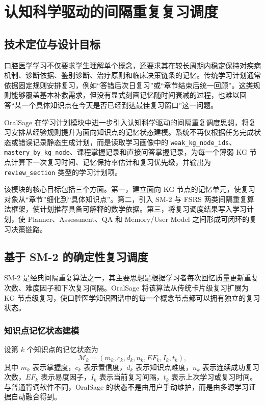
\chapter{认知科学驱动的间隔重复复习调度}
\label{sec:spaced-repetition-scheduling}

\section{技术定位与设计目标}

口腔医学学习不仅要求学生理解单个概念，还要求其在较长周期内稳定保持对疾病机制、诊断依据、鉴别诊断、治疗原则和临床决策链条的记忆。传统学习计划通常依据固定规则安排复习，例如“答错后次日复习”或“章节结束后统一回顾”。这类规则能够覆盖基本补救需求，但没有显式刻画记忆随时间衰减的过程，也难以回答“某一个具体知识点在今天是否已经到达最佳复习窗口”这一问题。

OralSage 在学习计划模块中进一步引入认知科学驱动的间隔重复调度思想，将复习安排从经验规则提升为面向知识点的记忆状态建模。系统不再仅根据任务完成状态或错误记录静态生成计划，而是读取学习画像中的 \texttt{weak\_kg\_node\_ids}、\texttt{mastery\_by\_kg\_node}、课程掌握记录和直接问答掌握记录，为每一个薄弱 KG 节点计算下一次复习时间、记忆保持率估计和复习优先级，并输出为 \texttt{review\_section} 类型的学习计划项。

该模块的核心目标包括三个方面。第一，建立面向 KG 节点的记忆单元，使复习对象从“章节”细化到“具体知识点”。第二，引入 SM-2 与 FSRS 两类间隔重复算法框架，使计划推荐具备可解释的数学依据。第三，将复习调度结果写入学习计划，使 Planner、Assessment、QA 和 Memory/User Model 之间形成可闭环的复习决策链路。

\section{基于 SM-2 的确定性复习调度}

SM-2 是经典间隔重复算法之一，其主要思想是根据学习者每次回忆质量更新重复次数、难度因子和下次复习间隔\cite{wozniak1990sm2}。OralSage 将该算法从传统卡片级复习扩展为 KG 节点级复习，使口腔医学知识图谱中的每一个概念节点都可以拥有独立的复习状态。

\subsection{知识点记忆状态建模}

设第 $k$ 个知识点的记忆状态为
\begin{equation}
  \mathcal{M}_k=(m_k,c_k,d_k,n_k,EF_k,I_k,t_k),
\end{equation}
其中 $m_k$ 表示掌握度，$c_k$ 表示置信度，$d_k$ 表示知识点难度，$n_k$ 表示连续成功复习次数，$EF_k$ 表示易度因子，$I_k$ 表示当前复习间隔，$t_k$ 表示上次学习或复习时间。与普通背词软件不同，OralSage 的状态不是由用户手动维护，而是由多源学习证据自动融合得到。

